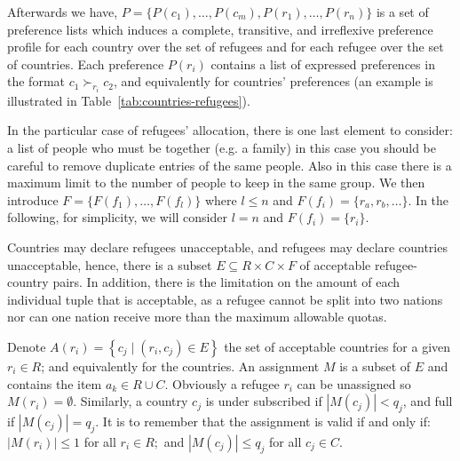 \documentclass[letterpaper]{article} %
\begin{document}
    Afterwards we have, \(P = \{P(c_1), \dots , P(c_m), P(r_1), \dots , P(r_n)\}\) is
    a set of preference lists which induces a complete, transitive, and irreflexive preference profile for each
    country over the set of refugees and for each refugee over the set of countries.
    Each preference \(P(r_i)\) contains a list of expressed preferences in the format
    \( c _ { 1 } \succ_{r _ { i }} c _ { 2 } \),
    and equivalently for countries' preferences (an example is illustrated in Table~\ref{tab:countries-refugees}).

    In the particular case of refugees' allocation, there is one last element to consider: a list of people who must be
    together (e.g. a family) in this case you should be careful to remove duplicate entries of the same people.
    Also in this case there is a maximum limit to the number of people to keep in the same group.
    We then introduce \(F=\{F(f_1), \dots, F(f_l)\}\) where \(l\leq n\) and \(F(f_i) = \{r_a, r_b, \dots\}\).
    In the following, for simplicity, we will consider \(l=n\) and \(F(f_i)=\{r_i\}\).

    Countries may declare refugees unacceptable, and refugees may declare countries unacceptable,
    hence, there is a subset \(E \subseteq R \times C \times F\) of acceptable refugee-country pairs.
    In addition, there is the limitation on the amount of each individual tuple that is acceptable, as a refugee cannot
    be split into two nations nor can one nation receive more than the maximum allowable quotas.

    Denote \( A \left( r _ { i } \right) = \left\{ c _ { j } \mid \left( r _ { i } , c _ { j } \right) \in E \right\} \)
    the set of acceptable countries for a given \( r _ { i } \in R \); and equivalently for the countries.
    An assignment \(M\) is a subset of \(E\) and contains the item \( a _ { k } \in R \cup C \).
    Obviously a refugee \( r _ { i } \) can be unassigned so \( M \left( r _ { i } \right) = \emptyset \).
    Similarly, a country \( c _ { j } \) is
    under subscribed if \( \left| M \left( c _ { j } \right) \right| < q _ { j } \), and full if
    \( \left| M \left( c _ { j } \right) \right| = q _ { j } \).
    It is to remember that the assignment is valid if and only if:
    \( \left| M \left( r _ { i } \right) \right| \leq 1 \) for all \( r _ { i } \in R ; \) and
    \( \left| M \left( c _ { j } \right) \right| \leq q _ { j } \) for all \( c _ { j } \in C  \).
\end{document}
